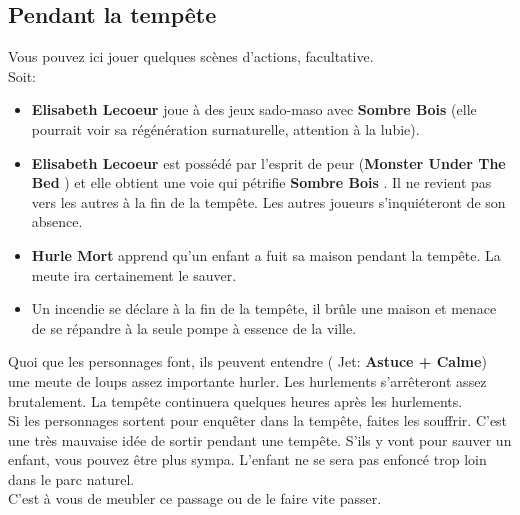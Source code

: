 \documentclass[oneside,12pt]{book}
\newcommand\roll[1]{
( Jet: \textbf{#1})
}
\newcommand{\Peter}{\textbf{Hurle Mort} }
\newcommand{\Leonard}{\textbf{Sombre Bois} }
\newcommand{\Monster}{\textbf{Monster Under The Bed} }
\newcommand{\Elisabeth}{\textbf{Elisabeth Lecoeur} }
\begin{document}
\begin{flushleft}
\section{Pendant la tempête}
Vous pouvez ici jouer quelques scènes d'actions, facultative.\\
Soit:\\ 
\begin{itemize}
\item  \Elisabeth joue à des jeux sado-maso avec \Leonard (elle pourrait voir sa régénération surnaturelle, attention à la lubie).
\item \Elisabeth est possédé par l'esprit de peur (\Monster) et elle obtient une voie qui pétrifie \Leonard. Il ne revient pas vers les autres à la fin de la tempête. Les autres joueurs s'inquiéteront de son absence.
\item \Peter apprend qu'un enfant a fuit sa maison pendant la tempête. La meute ira certainement le sauver.
\item Un incendie se déclare à la fin de la tempête, il brûle une maison et menace de se répandre à la seule pompe à essence de la ville. 
\end{itemize}
Quoi que les personnages font, ils peuvent entendre \roll{Astuce + Calme} une meute de loups assez importante hurler. Les hurlements s'arrêteront assez brutalement. La tempête continuera quelques heures après les hurlements. \\
Si les personnages sortent pour enquêter dans la tempête, faites les souffrir. C'est une très mauvaise idée de sortir pendant une tempête. S'ils y vont pour sauver un enfant, vous pouvez être plus sympa. L'enfant ne se sera pas enfoncé trop loin dans le parc naturel.\\
C'est à vous de meubler ce passage ou de le faire vite passer.


\end{flushleft}
\end{document}

